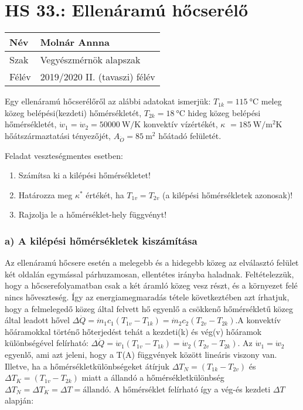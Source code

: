 		
\section*{HS 33.: Ellenáramú hőcserélő}	

\begin{tabular}{ | p{2cm} | p{14cm} | } 
	\hline
	Név & Molnár Annna \\ 
	\hline
	Szak & Vegyészmérnök alapszak \\ 
	\hline
	Félév & 2019/2020 II. (tavaszi) félév \\ 
	\hline
\end{tabular}
\vspace{0.5cm}

\noindent
 Egy ellenáramú hőcserélőről az alábbi adatokat ismerjük:
$T_{1k} = \SI{115}{\celsius}$ meleg közeg belépési(kezdeti) hőmérsékletét,
$T_{2k} = \SI{18}{\celsius}$ hideg közeg belépési hőmérsékletét,
$\dot{w}_1 = \dot{w}_2 =\SI{50000}{\watt\per\kelvin}$ konvektív vízértékét,
$\kappa$ $= \SI{185}{\watt\per\meter\squared\kelvin}$ hőátszármaztatási tényezőjét,
$A_{\ddot{O}} = \SI{85}{\meter\squared}$ hőátadó felületét.
\vspace{5mm}

\noindent
Feladat veszteségmentes esetben:
\begin{enumerate}[label=\alph*)]
 \item Számítsa ki a kilépési hőmérsékletet! 
 \item Határozza meg $\kappa^ *$ értékét, ha $T_{1v} = T_{2v}$ (a kilépési hőmérsékletek azonosak)!
\item Rajzolja le a hőmérséklet-hely függvényt!
\end{enumerate}
\vspace{5mm}
\subsubsection*{a) A kilépési hőmérsékletek kiszámítása}

 Az ellenáramú hőcsere esetén a melegebb és a hidegebb közeg az elválasztó felület két oldalán egymással párhuzamosan, ellentétes irányba haladnak. Feltételezzük, hogy a hőcserefolyamatban csak a két áramló közeg vesz részt, és a környezet felé nincs hőveszteség. Így az energiamegmaradás tétele következtében azt írhatjuk, hogy a felmelegedő közeg által felvett hő egyenlő a csökkenő hőmérsékletű közeg által leadott hővel $\Delta \dot{Q} = \dot{m}_1{c}_1 \left(T_{1v} - T_{1k}\right)=\dot{m}_2{c}_2 \left(T_{2v} - T_{2k}\right)$.A konvektív hőáramokkal történő  hőterjedést tehát a kezdeti(k) és vég(v) hőáramok különbségével felírható: $\Delta \dot{Q} = \dot{w}_1 \left(T_{1v} - T_{1k}\right)=\dot{w}_2 \left(T_{2v} - T_{2k}\right)$.
 Az $\dot{w}_1 = \dot{w}_2$ egyenlő, ami azt jeleni, hogy a T(A) függvények között lineáris viszony van. Illetve, ha a hőmérsékletkülönbségeket átírjuk $\Delta T_N =\left(T_{1k} - T_{2v}\right)$ és $\Delta T_K= \left(T_{1v} - T_{2k}\right)$ miatt a állandó a hőmérsékletkülönbség $\Delta T_N = \Delta T_K = \Delta T = \textrm{állandó}$. A hőmérséklet felírható így a vég-és kezdeti $\Delta T$ alapján:
 
